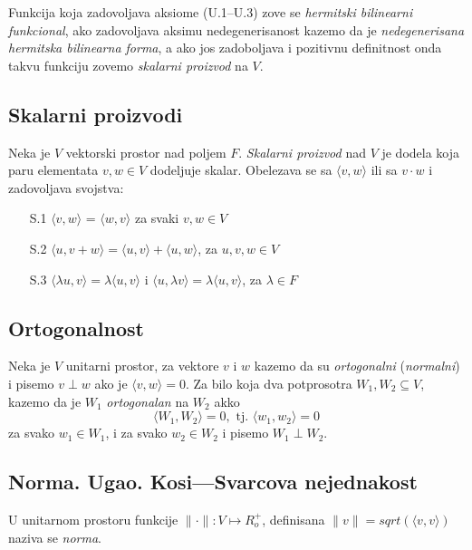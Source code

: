 \documentclass[12p,a4paper]{article}
\begin{document}
\begin{multicols}{2}
    Funkcija koja zadovoljava aksiome (U.1--U.3) zove se 
    \textit{hermitski bilinearni funkcional}, ako zadovoljava aksimu 
    nedegenerisanost kazemo da je 
    \textit{nedegenerisana hermitska bilinearna forma}, a ako jos zadoboljava 
    i pozitivnu definitnost onda takvu funkciju zovemo 
    \textit{skalarni proizvod} na $V$.

\subsection{Skalarni proizvodi}

    Neka je $V$ vektorski prostor nad poljem $F$. \textit{Skalarni proizvod}  
    nad $V$ je dodela koja paru elementata $v, w \in V$ dodeljuje skalar.
    Obelezava se sa $\langle v, w \rangle$ ili sa $v \cdot w$ i zadovoljava 
    svojstva:
    \begin{enumerate}
        \itemsep0em
        \item [S.1] $\langle v, w \rangle$ = $\langle w, v \rangle$ za svaki 
            $v, w \in V$
        \item [S.2] $\langle u, v + w \rangle = 
            \langle u, v \rangle + \langle u, w \rangle$, za $u,v,w \in V$
        \item [S.3] $\langle \lambda u, v \rangle = 
            \lambda \langle u, v \rangle$ 
            i $\langle u, \lambda v \rangle = \lambda \langle u, v \rangle$, 
            za $\lambda \in F$
    \end{enumerate}

\subsection{Ortogonalnost}

    Neka je $V$ unitarni prostor, za vektore $v$ i $w$ kazemo da su 
    \textit{ortogonalni} (\textit{normalni}) i pisemo $v \perp w$ ako je 
    $\langle v, w \rangle = 0$.
    Za bilo koja dva potprosotra $W_1, W_2 \subseteq V$, kazemo da je $W_1$ 
    \textit{ortogonalan} na $W_2$ akko
    \[
        \langle W_1, W_2 \rangle = 0, \text{ tj.\ }\langle w_1, w_2 \rangle = 0
    \]
    za svako $w_1 \in W_1$, i za svako $w_2 \in W_2$ i pisemo $W_1 \perp W_2$.

\subsection{Norma. Ugao. Kosi---Svarcova nejednakost}

    U unitarnom prostoru funkcije $\| \cdot \| : V \mapsto R_o^+$, definisana
    $\|v\|=sqrt(\langle v, v \rangle)$ naziva se \textit{norma}.


\end{multicols}
\end{document}

